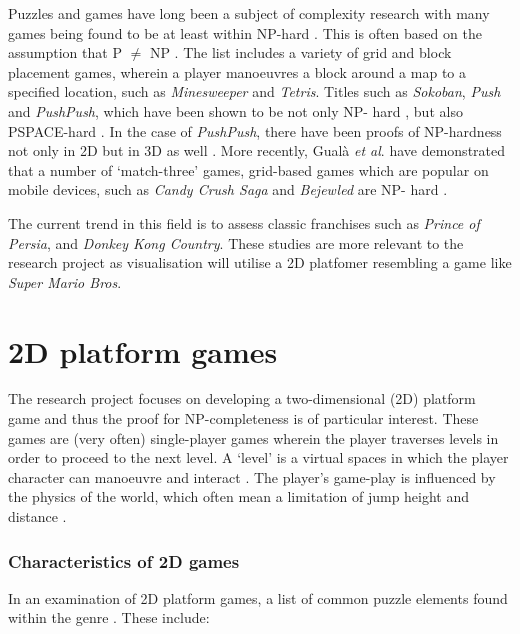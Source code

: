 \documentclass[11pt, a4paper, oneside]{report} %
\begin{document}
Puzzles and games have long been a subject of complexity research with many
games being found to be at least within NP-hard \cite{kendall2008survey}. This
is often based on the assumption that P $\neq$ NP \cite{demaine2001playing}. The
list includes a variety of grid and block placement games, wherein a player
manoeuvres a block around a map to a specified location, such as
\textit{Minesweeper}\cite{kaye2000minesweeper} and
\textit{Tetris}\cite{demaine2003tetris}. Titles such as \textit{Sokoban},
\textit{Push} and \textit{PushPush}, which have been shown to be not only NP-
hard \cite{demaine2000pushpush}, but also PSPACE-hard
\cite{culberson1999sokoban, dor1999sokoban}. In the case of \textit{PushPush},
there have been proofs of NP-hardness not only in 2D but in 3D as well
\cite{o1999pushpush}. More recently, Gual\`{a} \textit{et al}. have demonstrated
that a number of `match-three' games, grid-based games which are popular on
mobile devices, such as \textit{Candy Crush Saga} and \textit{Bejewled} are NP-
hard \cite{DBLP:journals/corr/GualaLN14}.

The current trend in this field is to assess classic franchises such as
\textit{Prince of Persia}, and \textit{Donkey Kong Country}. These studies are
more relevant to the research project as visualisation will utilise a 2D
platfomer resembling a game like \textit{Super Mario Bros}.


\section{2D platform games}

The research project focuses on developing a two-dimensional (2D) platform game
and thus the proof for NP-completeness is of particular interest. These games
are (very often) single-player games wherein the player traverses levels in
order to proceed to the next level. A `level' is a virtual spaces in which the
player character can manoeuvre and interact \cite{Burgun:2012}. The player's
game-play is influenced by the physics of the world, which often mean a
limitation of jump height and distance \cite{Burgun:2012}.

\subsubsection{Characteristics of 2D games}

In an examination of 2D platform games, a list of common puzzle elements found within the genre
\cite{Smith:2008:FAP:1401843.1401858,DBLP:conf/fun/Forisek10}. These include:
\end{document}
